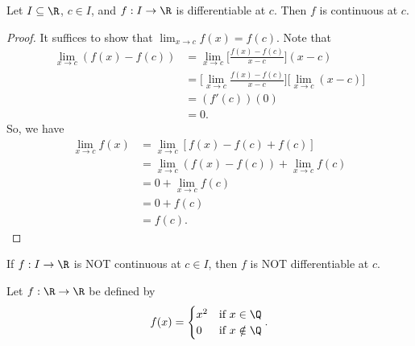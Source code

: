 \begin{theorem}
    Let \( I \subseteq  \R  \), \( c \in I  \), and \( f: I \to \R  \) is differentiable at \( c  \). Then \( f \) is continuous at \( c  \).
\end{theorem}

\begin{proof}
It suffices to show that \( \lim_{ x \to c } f(x) = f(c) \). Note that 
\begin{align*}
    \lim_{ x \to c } (f(x) - f(c)) &= \lim_{ x \to c }  \Big[ \frac{ f(x) - f(c) }{  x - c  }  \Big] (x - c) \\
                                   &= \Big[ \lim_{ x \to c }  \frac{ f(x) - f(c) }{  x - c  }  \Big] \Big[ \lim_{ x \to c }  (x - c) \Big] \\
                                   &= (f'(c)) (0) \\
                                   &= 0.
\end{align*}
So, we have 
\begin{align*}
    \lim_{ x \to c } f(x) &= \lim_{ x \to c }  [f(x)  - f(c) + f(c)] \\ 
                          &= \lim_{ x \to c } (f(x) - f(c)) + \lim_{ x \to c } f(c) \\   
                          &= 0 + \lim_{ x \to c } f(c) \\
                          &= 0 + f(c) \\
                          &= f(c).
\end{align*}
\end{proof}

\begin{corollary}
    If \( f: I \to \R  \) is NOT continuous at \( c \in I  \), then \( f \) is NOT differentiable at \( c  \).
\end{corollary}

\begin{eg}
    Let \( f: \R \to \R  \) be defined by 
    \[  f(x) = 
    \begin{cases}
        x^{2} &\text{if} \  x \in \Q \\
        0 &\text{if} \ x \notin \Q 
    \end{cases}. \]
\end{eg}

